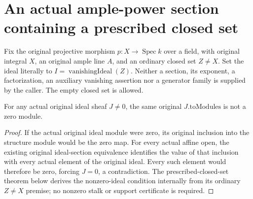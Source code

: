 \section{An actual ample-power section containing a prescribed closed set}
Fix the original projective morphism $p:X\to\operatorname{Spec}k$ over
a field, with original integral $X$, an original ample line $A$, and an
ordinary closed set $Z\ne X$. Set the ideal literally to
$I=\operatorname{vanishingIdeal}(Z)$. Neither a section, its exponent,
a factorization, an auxiliary vanishing assertion nor a generator family
is supplied by the caller. The empty closed set is allowed.

\begin{lemma}
\label{lem:projective-original-proper-closed-ideal-nonzero}
For any actual original ideal sheaf $J\ne0$, the same original
$J.\mathrm{toModules}$ is not a zero module.
\end{lemma}
\begin{proof}
If the actual original ideal module were zero, its
original inclusion into the structure module would be the zero map.
For every actual affine open, the existing original ideal-section
equivalence identifies the value of that inclusion with every actual
element of the original ideal. Every such element would therefore be
zero, forcing $J=0$, a contradiction. The prescribed-closed-set theorem
below derives the nonzero-ideal condition internally from its ordinary
$Z\ne X$ premise; no nonzero stalk or support certificate is required.
\end{proof}

